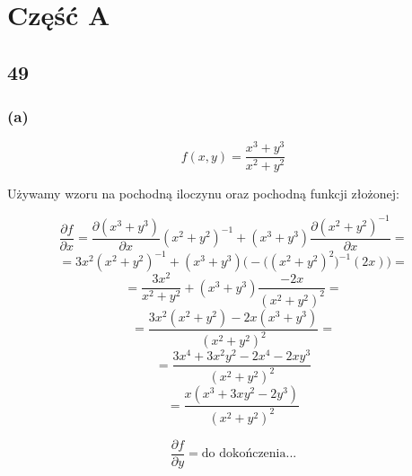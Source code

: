 \documentclass{article}
\begin{document}
\section{Część A}
 
\subsection*{49}

\subsubsection*{(a)}

\begin{equation*}
    f(x, y) = \frac{x^{3} + y^{3}}{x^{2} + y^{2}}
\end{equation*}

Używamy wzoru na pochodną iloczynu oraz pochodną funkcji złożonej:

\begin{equation*}
    \frac{\partial f}{\partial x} = \frac{\partial (x^{3} + y^{3})}{\partial x}(x^{2} + y^{2})^{-1} + (x^{3} + y^{3})\frac{\partial (x^{2} + y^{2})^{-1}}{\partial x} =
\end{equation*}
\begin{equation*}
    = 3x^{2}(x^{2} + y^{2})^{-1} + (x^{3} + y^{3})\Big(-\Big((x^{2} + y^{2})^{2}\Big)^{-1}(2x)\Big) =
\end{equation*}
\begin{equation*}
    = \frac{3x^{2}}{x^{2} + y^{2}} + (x^{3} + y^{3}) \frac{-2x}{(x^{2} + y^{2})^{2}} =
\end{equation*}
\begin{equation*}
    = \frac{3x^{2}(x^{2} + y^{2}) - 2x(x^{3} + y^{3})}{(x^{2} + y^{2})^{2}} =
\end{equation*}
\begin{equation*}
    = \frac{3x^{4} + 3x^{2}y^{2} - 2x^{4} - 2xy^{3}}{(x^{2} + y^{2})^{2}}
\end{equation*}
\begin{equation*}
    = \frac{x(x^{3} + 3xy^{2} - 2y^{3})}{(x^{2} + y^{2})^{2}}
\end{equation*}


\begin{equation*}
    \frac{\partial f}{\partial y} = \mbox{do dokończenia...}
\end{equation*}
\end{document}
